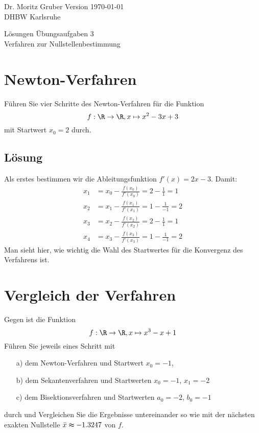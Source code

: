 
\usepackage{stix}



\vspace*{-20mm}
{
	\color{dhbwGray}
	Dr. Moritz Gruber	\hfill Version \today\\
	DHBW Karlsruhe\\
}

\vspace{10mm}
\begin{center}
	{
		{ \LARGE Lösungen Übungsaufgaben 3}\\[3mm]
		{\Large Verfahren zur Nullstellenbestimmung}
	}
\end{center}

\vspace{5mm}




\section{Newton-Verfahren}
Führen Sie vier Schritte des Newton-Verfahren für die Funktion
$$
f: \R \to \R, x \mapsto x^2-3x+3
$$
mit Startwert $x_0=2$ durch.
\subsection*{Lösung}
Als erstes bestimmen wir die Ableitungsfunktion $f'(x)=2x-3$. Damit:
\begin{align*}
x_1&=x_0-\frac{f(x_0)}{f'(x_0)}=2-\frac{1}{1}=1 \\
x_2&=x_1-\frac{f(x_1)}{f'(x_1)}=1-\frac{1}{-1}=2 \\
x_3&=x_2-\frac{f(x_2)}{f'(x_2)}=2-\frac{1}{1}=1 \\
x_4&=x_3-\frac{f(x_3)}{f'(x_3)}=1-\frac{1}{-1}=2 
\end{align*}
Man sieht hier, wie wichtig die Wahl des Startwertes für die Konvergenz des Verfahrens ist.
\newpage
\section{Vergleich der Verfahren}
Gegen ist die Funktion
$$
f: \R \to \R, x \mapsto x^3-x+1
$$
Führen Sie jeweils eines Schritt mit
\begin{itemize}
\item[a)] dem Newton-Verfahren und Startwert $x_0=-1$,
\item[b)] dem Sekantenverfahren und Startwerten $x_0=-1$, $x_1=-2$
\item[c)] dem Bisektionsverfahren und Startwerten $a_0=-2$, $b_0=-1$
\end{itemize}
durch und Vergleichen Sie die Ergebnisse untereinander so wie mit der nächsten exakten Nullstelle $\bar x \thickapprox -1.3247$ von $f$.
